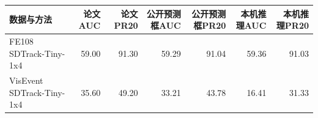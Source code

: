 \begin{tabular}{lrrrrrr}
\toprule
数据与方法 & 论文AUC & 论文PR20 & 公开预测框AUC & 公开预测框PR20 & 本机推理AUC & 本机推理PR20\\
\midrule
FE108 SDTrack-Tiny-1x4 & 59.00 & 91.30 & 59.29 & 91.04 & 59.36 & 91.03\\
VisEvent SDTrack-Tiny-1x4 & 35.60 & 49.20 & 33.21 & 43.78 & 16.41 & 31.33\\
\bottomrule
\end{tabular}